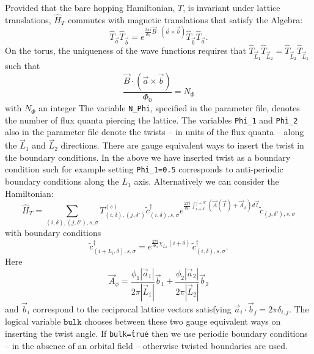  Provided that the bare hopping Hamiltonian, $T$,  is invariant under lattice translations, $\hat{H}_T$ commutes with magnetic translations  that satisfy the  Algebra: 
\begin{equation}
	\hat{T}_{\vec{a}} \hat{T}_{\vec{b}} =  e^{ \frac{2 \pi i}{\Phi_0}   \vec{B} \cdot \left( \vec{a} \times \vec{b} \right) }  \hat{T}_{\vec{b}} \hat{T}_{\vec{a}}. 
\end{equation}
On the  torus, the uniqueness of the wave functions requires that  $\hat{T}_{\vec{L}_1} \hat{T}_{\vec{L}_2}  =   \hat{T}_{\vec{L}_2} \hat{T}_{\vec{L}_1} $ such
that
\begin{equation}
	 \frac{\vec{B} \cdot \left( \vec{a} \times \vec{b}  \right) }{\Phi_0 } = N_{\Phi}   
\end{equation}
with  $N_\Phi $ an integer  The variable \texttt{N\_Phi},   specified in the parameter file,   denotes the number of flux quanta piercing the lattice.    The variables \texttt{Phi\_1}  and   \texttt{Phi\_2} also   in the parameter file denote  the twists  -- in units of the flux quanta  --  along the $\vec{L}_1$ and  $\vec{L}_2$ directions.     There are gauge  equivalent ways to insert the  twist in the boundary conditions. In the above we  have inserted   twist as a boundary condition such  for example setting  \texttt{Phi\_1=0.5}  corresponds to anti-periodic boundary conditions along the $L_1$  axis.   Alternatively we  can  consider the 
Hamiltonian:
\begin{equation}
	   \hat{H}_T = \sum_{(i,\delta), (j,\delta'), s, \sigma}    T_{(i,\delta), (j,\delta')}^{(s)}    \tilde{c}^{\dagger}_{(i,\delta),s,\sigma }   e^{\frac{2 \pi i}{\Phi_0} \int_{i + \delta}^{j + \delta'} \left(  \vec{A}(\vec{l})  + \vec{A}_{\phi} \right)  d \vec{l}} \tilde{c}^{}_{(j,\delta'),s,\sigma }
\end{equation}
with boundary conditions 
\begin{equation}
	\tilde{c}^{\dagger}_{(i + L_i,\delta) ,s,\sigma }   =  e^{\frac{2 \pi i }{\Phi_0} \chi_{L_1} ( i + \delta ) } \, \tilde{c}^{\dagger}_{(i,\delta) ,s,\sigma }.
\end{equation}
Here 
\begin{equation}
	\vec{A}_{\phi} =\frac{  \phi_1  |\vec{a}_1|} { 2 \pi |\vec{L}_1| } \vec{b}_1 +  \frac{  \phi_2  |\vec{a}_2|}{2 \pi  |\vec{L}_2| } \vec{b}_2
\end{equation}
and $\vec{b}_i$  correspond to the reciprocal lattice vectors satisfying  $ \vec{a}_i  \cdot  \vec{b}_j  = 2 \pi \delta_{i,j} $.   The logical variable $\texttt{bulk} $ chooses between these two  gauge equivalent ways  on inserting the twist angle. If \texttt{bulk=\.true\.}    then  we use periodic boundary conditions  --  in the absence of an orbital field -- otherwise  twisted boundaries are used.  
